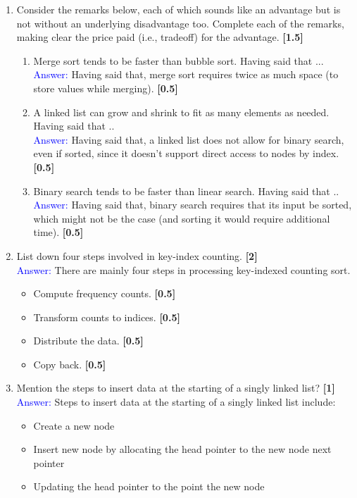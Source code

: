 \documentclass[12pt ,a4paper]{exam}
\begin{document}
\begin{enumerate}[start=1,label={\bfseries Q\arabic*)}]
	    \item Consider the remarks below, each of which sounds like an advantage but is not without an underlying disadvantage too. Complete each of the remarks, making clear the price paid (i.e., tradeoff) for the advantage. \hfill \textbf{[1.5]}
	    \begin{enumerate}[start=1,label={\bfseries \roman*)}]
	    	\item Merge sort tends to be faster than bubble sort. Having said that ...\\
	    	\textcolor{blue}{Answer: } 	Having said that, merge sort requires twice as much space (to store values while merging).  \hfill \textbf{[0.5]}
	    	\item A linked list can grow and shrink to fit as many elements as needed. Having said that ..\\
	    	\textcolor{blue}{Answer: }  Having said that, a linked list does not allow for binary search, even if sorted, since it doesn’t support direct access to nodes by index.  \hfill \textbf{[0.5]}
	    	\item Binary search tends to be faster than linear search. Having said that ..\\
	    	\textcolor{blue}{Answer: } Having said that, binary search requires that its input be sorted, which might not be the case (and sorting it would require additional time).  \hfill \textbf{[0.5]}
	    \end{enumerate}
	   \item List down four steps involved in key-index counting. \hfill \textbf{[2]}\\
	   \textcolor{blue}{Answer: } 	There are mainly four steps in processing key-indexed counting sort.
	   \begin{itemize}
	   	\item Compute frequency counts. \hfill \textbf{[0.5]}
	   	\item Transform counts to indices. \hfill \textbf{[0.5]}
	   	\item Distribute the data. \hfill \textbf{[0.5]}
	   	\item Copy back. \hfill \textbf{[0.5]}
	   \end{itemize}
       \item Mention the steps to insert data at the starting of a singly linked list?  \hfill \textbf{[1]}\\
       \textcolor{blue}{Answer: } Steps to insert data at the starting of a singly linked list include:
       \begin{itemize}
       	 \item Create a new node
       	 \item Insert new node by allocating the head pointer to the new node next pointer
       	 \item Updating the head pointer to the point the new node
       \end{itemize}
	\end{enumerate}
\end{document}
